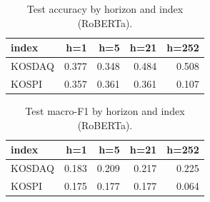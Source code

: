 \begin{table}[t]\centering
\caption{Test accuracy by horizon and index (RoBERTa).}
\begin{tabular}{lrrrr}
\toprule
index & h=1 & h=5 & h=21 & h=252 \\
\midrule
KOSDAQ & 0.377 & 0.348 & 0.484 & 0.508 \\
KOSPI & 0.357 & 0.361 & 0.361 & 0.107 \\
\bottomrule
\end{tabular}
\end{table}

\begin{table}[t]\centering
\caption{Test macro-F1 by horizon and index (RoBERTa).}
\begin{tabular}{lrrrr}
\toprule
index & h=1 & h=5 & h=21 & h=252 \\
\midrule
KOSDAQ & 0.183 & 0.209 & 0.217 & 0.225 \\
KOSPI & 0.175 & 0.177 & 0.177 & 0.064 \\
\bottomrule
\end{tabular}
\end{table}